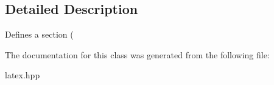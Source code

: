 \subsection{Detailed Description}
Defines a section (

The documentation for this class was generated from the following file\-:\begin{DoxyCompactItemize}
\item 
latex.\-hpp\end{DoxyCompactItemize}
